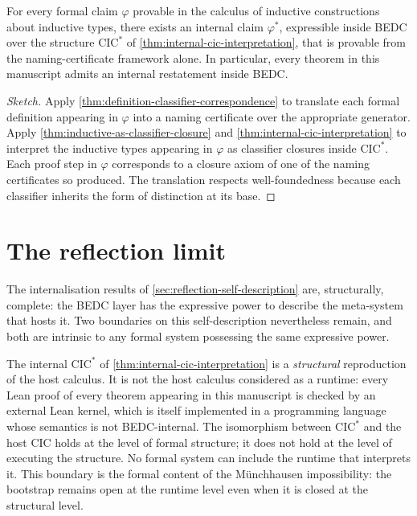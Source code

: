 \begin{corollary}
\label{cor:bedc-self-description}
For every formal claim $\varphi$ provable in the calculus of inductive constructions about inductive types, there exists an internal claim $\varphi^{*}$, expressible inside BEDC over the structure $\mathrm{CIC}^{*}$ of \autoref{thm:internal-cic-interpretation}, that is provable from the naming-certificate framework alone. In particular, every theorem in this manuscript admits an internal restatement inside BEDC.
\end{corollary}

\begin{proof}[Sketch]
Apply \autoref{thm:definition-classifier-correspondence} to translate each formal definition appearing in $\varphi$ into a naming certificate over the appropriate generator. Apply \autoref{thm:inductive-as-classifier-closure} and \autoref{thm:internal-cic-interpretation} to interpret the inductive types appearing in $\varphi$ as classifier closures inside $\mathrm{CIC}^{*}$. Each proof step in $\varphi$ corresponds to a closure axiom of one of the naming certificates so produced. The translation respects well-foundedness because each classifier inherits the form of distinction at its base.
\end{proof}

\section{The reflection limit}
\label{sec:reflection-limit}

The internalisation results of \autoref{sec:reflection-self-description} are, structurally, complete: the BEDC layer has the expressive power to describe the meta-system that hosts it. Two boundaries on this self-description nevertheless remain, and both are intrinsic to any formal system possessing the same expressive power.

\begin{remark}
\label{rem:reflection-structure-existence-boundary}
The internal $\mathrm{CIC}^{*}$ of \autoref{thm:internal-cic-interpretation} is a \emph{structural} reproduction of the host calculus. It is not the host calculus considered as a runtime: every Lean proof of every theorem appearing in this manuscript is checked by an external Lean kernel, which is itself implemented in a programming language whose semantics is not BEDC-internal. The isomorphism between $\mathrm{CIC}^{*}$ and the host CIC holds at the level of formal structure; it does not hold at the level of executing the structure. No formal system can include the runtime that interprets it. This boundary is the formal content of the M\"unchhausen impossibility: the bootstrap remains open at the runtime level even when it is closed at the structural level.
\end{remark}

